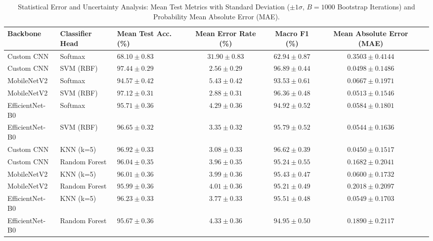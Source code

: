 \begin{table}[t]
\caption{Statistical Error and Uncertainty Analysis: Mean Test Metrics with Standard Deviation ($\pm 1\sigma$, $B=1000$ Bootstrap Iterations) and Probability Mean Absolute Error (MAE).}
\label{tab:statistical_errors}
\centering
\small
\begin{tabular}{lllcccc}
\toprule
\textbf{Backbone} & \textbf{Classifier Head} & \textbf{Mean Test Acc. (\%)} & \textbf{Mean Error Rate (\%)} & \textbf{Macro F1 (\%)} & \textbf{Mean Absolute Error (MAE)} \\
\midrule
Custom CNN & Softmax & $68.10 \pm 0.83$ & $31.90 \pm 0.83$ & $62.94 \pm 0.87$ & $0.3503 \pm 0.4144$ \\
Custom CNN & SVM (RBF) & $97.44 \pm 0.29$ & $2.56 \pm 0.29$ & $96.89 \pm 0.44$ & $0.0498 \pm 0.1486$ \\
MobileNetV2 & Softmax & $94.57 \pm 0.42$ & $5.43 \pm 0.42$ & $93.53 \pm 0.61$ & $0.0667 \pm 0.1971$ \\
MobileNetV2 & SVM (RBF) & $97.12 \pm 0.31$ & $2.88 \pm 0.31$ & $96.36 \pm 0.48$ & $0.0513 \pm 0.1546$ \\
EfficientNet-B0 & Softmax & $95.71 \pm 0.36$ & $4.29 \pm 0.36$ & $94.92 \pm 0.52$ & $0.0584 \pm 0.1801$ \\
EfficientNet-B0 & SVM (RBF) & $96.65 \pm 0.32$ & $3.35 \pm 0.32$ & $95.79 \pm 0.52$ & $0.0544 \pm 0.1636$ \\
Custom CNN & KNN (k=5) & $96.92 \pm 0.33$ & $3.08 \pm 0.33$ & $96.62 \pm 0.39$ & $0.0450 \pm 0.1517$ \\
Custom CNN & Random Forest & $96.04 \pm 0.35$ & $3.96 \pm 0.35$ & $95.24 \pm 0.55$ & $0.1682 \pm 0.2041$ \\
MobileNetV2 & KNN (k=5) & $96.01 \pm 0.36$ & $3.99 \pm 0.36$ & $95.43 \pm 0.47$ & $0.0600 \pm 0.1732$ \\
MobileNetV2 & Random Forest & $95.99 \pm 0.36$ & $4.01 \pm 0.36$ & $95.21 \pm 0.49$ & $0.2018 \pm 0.2097$ \\
EfficientNet-B0 & KNN (k=5) & $96.23 \pm 0.33$ & $3.77 \pm 0.33$ & $95.51 \pm 0.48$ & $0.0549 \pm 0.1703$ \\
EfficientNet-B0 & Random Forest & $95.67 \pm 0.36$ & $4.33 \pm 0.36$ & $94.95 \pm 0.50$ & $0.1890 \pm 0.2117$ \\
\bottomrule
\end{tabular}
\end{table}